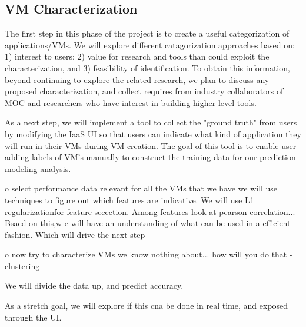 \subsection{VM Characterization}

The first step in this phase of the project is to create a useful categorization of applications/VMs.  We will explore different catagorization approaches based on: 1) interest to users; 2) value for research and tools than could exploit the characterization, and 3) feasibility of identification. To obtain this information, beyond continuing to explore the related research, we plan to discuss any proposed characterization, and collect requires from industry collaborators of MOC and researchers who have interest in building higher level tools. 

As a next step, we will implement a tool to collect the "ground truth" from users by modifying the IaaS UI so that users can indicate what kind of application they will run in their VMs during VM creation.  The goal of this tool is to enable user adding labels of VM's manually to construct the training data for our prediction modeling analysis.

o select performance data relevant
for all the VMs that we have 
we will use techniques to figure out which features are indicative.  We will use L1 regularizationfor feature secection.  Among features look at pearson correlation...
Bsaed on this,w e will have an understanding of what can be used in a efficient fashion.  Which will drive the next step

o now try to characterize VMs we know nothing about... how will you do that - clustering 

We will divide the data up, and predict accuracy.

As a stretch goal, we will explore if this cna be done in real time, and exposed through the UI. 
